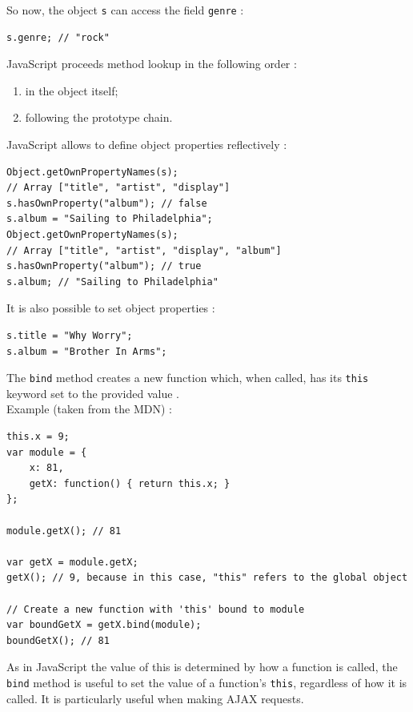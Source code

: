 \documentclass[a4paper,10pt]{article}
\begin{document}
So now, the object \lstinline|s| can access the field \lstinline|genre| :
\begin{lstlisting}
s.genre; // "rock"
\end{lstlisting}

JavaScript proceeds method lookup in the following order \cite{js:objectmodel} :
\begin{enumerate}
\item in the object itself;
\item following the prototype chain.
\end{enumerate}


\bigskip
JavaScript allows to define object properties reflectively :
\begin{lstlisting}
Object.getOwnPropertyNames(s);
// Array ["title", "artist", "display"]
s.hasOwnProperty("album"); // false
s.album = "Sailing to Philadelphia";
Object.getOwnPropertyNames(s);
// Array ["title", "artist", "display", "album"]
s.hasOwnProperty("album"); // true
s.album; // "Sailing to Philadelphia"
\end{lstlisting}

It is also possible to set object properties :
\begin{lstlisting}
s.title = "Why Worry";
s.album = "Brother In Arms";
\end{lstlisting}


\medskip
\label{bind}
The \lstinline|bind| method creates a new function which, when called, has its \lstinline|this| keyword set to the provided value \cite{js:bind}. \\
Example (taken from the MDN) :
\begin{lstlisting}
this.x = 9;
var module = {
	x: 81,
	getX: function() { return this.x; }
};

module.getX(); // 81

var getX = module.getX;
getX(); // 9, because in this case, "this" refers to the global object

// Create a new function with 'this' bound to module
var boundGetX = getX.bind(module);
boundGetX(); // 81
\end{lstlisting}

As in JavaScript the value of this is determined by how a function is called, the \lstinline|bind| method is useful to set the value of a function’s \lstinline|this|, regardless of how it is called.
It is particularly useful when making AJAX requests.
\end{document}
